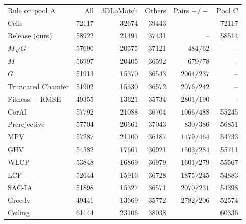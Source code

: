 \footnotesize\setlength{\tabcolsep}{2.5pt}%
\begin{tabular}{@{}lrrrrr@{}}
\toprule
Rule on pool A & All & 3DLoMatch & Others & Pairs $+/{-}$ & Pool C \\
Cells & 72117 & 32674 & 39443 & & 72117 \\
\midrule
Release (ours) & 58922 & 21491 & 37431 & -- & 58514 \\
\midrule
$M\sqrt{G}$ & 57696 & 20575 & 37121 & $484/62$ & -- \\
$M$ & 56997 & 20405 & 36592 & $679/78$ & -- \\
$G$ & 51913 & 15370 & 36543 & $2064/237$ & -- \\
Truncated Chamfer & 51902 & 15330 & 36572 & $2076/242$ & -- \\
Fitness + RMSE & 49355 & 13621 & 35734 & $2801/190$ & -- \\
\midrule
CorAl~\cite{adolfsson2021coral} & 57792 & 21088 & 36704 & $1066/488$ & 55245 \\
Prerejective~\cite{buch2013prerejective} & 57704 & 20661 & 37043 & $830/386$ & 56851 \\
MPV~\cite{razlaw2015mpv} & 57287 & 21100 & 36187 & $1179/464$ & 54733 \\
GHV~\cite{aldoma2012ghv} & 54582 & 17661 & 36921 & $1503/284$ & 55711 \\
WLCP~\cite{mellado2014super4pcs} & 53848 & 16869 & 36979 & $1601/279$ & 55567 \\
LCP~\cite{aiger2008fpcs} & 52644 & 15916 & 36728 & $1875/245$ & 54883 \\
SAC-IA~\cite{rusu2009fpfh} & 51898 & 15327 & 36571 & $2070/231$ & 54398 \\
Greedy~\cite{rusu2011pcl} & 49441 & 13669 & 35772 & $2782/206$ & 52574 \\
\midrule
Ceiling & 61144 & 23106 & 38038 & & 60336 \\
\bottomrule
\end{tabular}%
